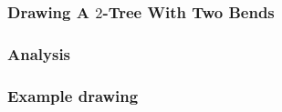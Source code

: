 \subsubsection{Drawing A $2$-Tree With Two Bends}

\subsubsection{Analysis}

\subsubsection{Example drawing}


